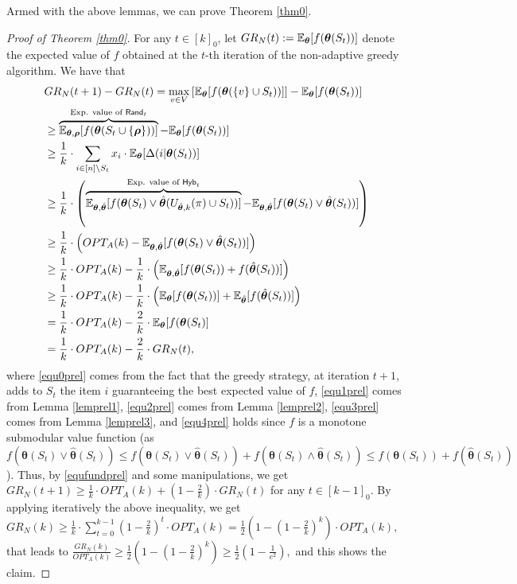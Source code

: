 Armed with the above lemmas, we can prove Theorem \ref{thm0}.
\begin{proof}[Proof of Theorem \ref{thm0}]
For any $t\in [k]_0$, let $GR_N(t):=\mathbb{E}_{\bm \theta}[f(\bm \theta(S_t))]$ denote the expected value of $f$ obtained at the $t$-th iteration of the non-adaptive greedy algorithm. We have that
\begin{align}
&GR_N(t+1)-GR_N(t)=\max_{v\in V}\left[\mathbb{E}_{\bm \theta}[f(\bm\theta(\{v\}\cup S_t))]\right]-\mathbb{E}_{\bm \theta}[f(\bm\theta(S_t))]\label{equ0prel}\\
&\geq \overbrace{\mathbb{E}_{\bm \theta,\bm \rho}[f(\bm\theta(S_{t}\cup\{\bm \rho\}))]}^{\text{Exp. value of }{\sf Rand}_t}-\mathbb{E}_{\bm \theta}[f(\bm\theta(S_t))]\nonumber\\
&\geq \frac{1}{k}\cdot \sum_{i\in [n]\setminus S_t}x_i\cdot \mathbb{E}_{\bm\theta}[\Delta(i|\bm\theta(S_t))]\label{equ1prel}\\
&\geq \frac{1}{k}\cdot\left(\overbrace{\mathbb{E}_{\bm\theta,\hat{\bm \theta}}[f(\bm\theta(S_t)\vee \hat{\bm \theta}(U_{\hat{\bm\theta},k}(\pi)\cup S_t))]}^{\text{Exp. value of }{\sf Hyb}_t}-\mathbb{E}_{\bm\theta,\hat{\bm \theta}}[f( \bm\theta(S_t)\vee\hat{\bm \theta}(S_t))]\right)\label{equ2prel}\\
&\geq \frac{1}{k}\cdot\left(OPT_A(k)-\mathbb{E}_{\bm\theta,\hat{\bm \theta}}[f( \bm\theta(S_t)\vee\hat{\bm \theta}(S_t))]\right)\label{equ3prel}\\
&\geq \frac{1}{k}\cdot OPT_A(k)-\frac{1}{k}\cdot \left(\mathbb{E}_{\bm\theta,\hat{\bm \theta}}[f( \bm\theta(S_t))+f( \hat{\bm\theta}(S_t))]\right)\label{equ4prel}\\ 
&\geq \frac{1}{k}\cdot OPT_A(k)-\frac{1}{k}\cdot \left(\mathbb{E}_{\bm\theta}[f( \bm\theta(S_t))]+\mathbb{E}_{\hat{\bm \theta}}[f( \hat{\bm\theta}(S_t))]\right)\nonumber\\
&= \frac{1}{k}\cdot OPT_A(k)
-\frac{2}{k}\cdot \mathbb{E}_{\bm\theta}[f(\bm\theta(S_t)]\nonumber\\
&=\frac{1}{k}\cdot OPT_A(k)-\frac{2}{k}\cdot GR_N(t),\label{equfundprel}
\end{align}
where \eqref{equ0prel} comes from the fact that the greedy strategy, at iteration $t+1$, adds to $S_t$ the item $i$ guaranteeing the best expected value of $f$, \eqref{equ1prel} comes from Lemma \ref{lemprel1}, \eqref{equ2prel} comes from Lemma \ref{lemprel2}, \eqref{equ3prel} comes from Lemma \ref{lemprel3}, and \eqref{equ4prel} holds since $f$ is a monotone submodular value function (as $f(\bm\theta(S_t)\vee\hat{\bm \theta}(S_t))\leq f(\bm\theta(S_t)\vee\hat{\bm \theta}(S_t))+f(\bm\theta(S_t)\wedge\hat{\bm \theta}(S_t))\leq f( \bm\theta(S_t))+f( \hat{\bm\theta}(S_t))$). Thus, by \eqref{equfundprel} and some manipulations, we get $
{GR}_N(t+1)\geq \frac{1}{k}\cdot OPT_A(k)+\left(1-\frac{2}{k}\right)\cdot {GR}_N(t)$ for any $t\in [k-1]_0.$ By applying iteratively the above inequality, we get $
{GR}_N(k)\geq \frac{1}{k}\cdot \sum_{t=0}^{k-1}\left(1-\frac{2}{k}\right)^{t}\cdot OPT_A(k)=\frac{1}{2}\left(1-\left(1-\frac{2}{k}\right)^{k}\right)\cdot OPT_A(k),$ that leads to $\frac{{GR}_N(k)}{OPT_A(k)}\geq \frac{1}{2}\left(1-\left(1-\frac{2}{k}\right)^{k}\right) \geq \frac{1}{2}\left(1-\frac{1}{e^2}\right),$ and this shows the claim. 
\end{proof}


